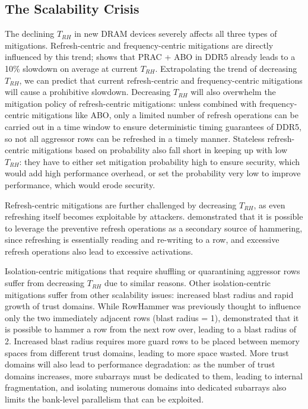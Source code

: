 \documentclass[journal,twocolumn]{IEEEtran}
\begin{document}
\subsection{The Scalability Crisis}

The declining $T_{RH}$ in new DRAM devices severely affects all three types of mitigations. Refresh-centric and frequency-centric mitigations are directly influenced by this trend; \cite{Vittal25} shows that PRAC + ABO in DDR5 already leads to a 10\% slowdown on average at current $T_{RH}$. Extrapolating the trend of decreasing $T_{RH}$, we can predict that current refresh-centric and frequency-centric mitigations will cause a prohibitive slowdown. Decreasing $T_{RH}$ will also overwhelm the mitigation policy of refresh-centric mitigations: unless combined with frequency-centric mitigations like ABO, only a limited number of refresh operations can be carried out in a time window to ensure deterministic timing guarantees of DDR5\cite{Qureshi25}, so not all aggressor rows can be refreshed in a timely manner. Stateless refresh-centric mitigations based on probability also fall short in keeping up with low $T_{RH}$: they have to either set mitigation probability high to ensure security, which would add high performance overhead, or set the probability very low to improve performance, which would erode security.

Refresh-centric mitigations are further challenged by decreasing $T_{RH}$, as even refreshing itself becomes exploitable by attackers. \cite{Kogler22} demonstrated that it is possible to leverage the preventive refresh operations as a secondary source of hammering, since refreshing is essentially reading and re-writing to a row, and excessive refresh operations also lead to excessive activations.

Isolation-centric mitigations that require shuffling or quarantining aggressor rows suffer from decreasing $T_{RH}$ due to similar reasons. Other isolation-centric mitigations suffer from other scalability issues: increased blast radius and rapid growth of trust domains. While RowHammer was previously thought to influence only the two immediately adjacent rows (blast radius = 1), \cite{Kogler22} demonstrated that it is possible to hammer a row from the next row over, leading to a blast radius of 2\cite{Marazzi23}. Increased blast radius requires more guard rows to be placed between memory spaces from different trust domains, leading to more space wasted. More trust domains will also lead to performance degradation: as the number of trust domains increases, more subarrays must be dedicated to them, leading to internal fragmentation, and isolating numerous domains into dedicated subarrays also limits the bank-level parallelism that can be exploited\cite{M25}.
\end{document}
